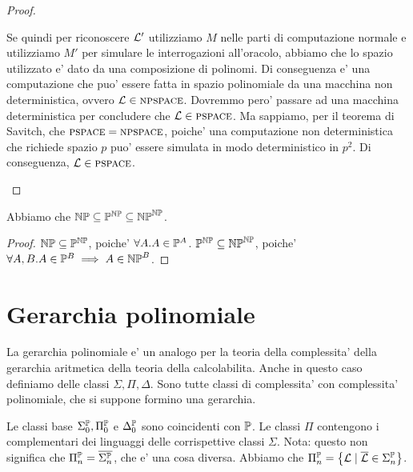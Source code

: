 \begin{proof}
\begin{enumerate}
                    Se quindi per riconoscere $\mathcal{L}'$ utilizziamo $M$ nelle parti di computazione
                    normale e utilizziamo $M'$ per simulare le interrogazioni all'oracolo, abbiamo
                    che lo spazio utilizzato e' dato da una composizione di polinomi. Di conseguenza
                    e' una computazione che puo' essere fatta in spazio polinomiale da una macchina
                    non deterministica, ovvero $\mathcal{L} \in \textsc{npspace}$. Dovremmo pero' passare ad una
                    macchina deterministica per concludere che $\mathcal{L} \in \textsc{pspace}$. Ma sappiamo, per
                    il teorema di Savitch, che $\textsc{pspace} = \textsc{npspace}$, poiche' una computazione non
                    deterministica che richiede spazio $p$ puo' essere simulata in modo
                    deterministico in $p^{2}$. Di conseguenza, $\mathcal{L} \in \textsc{pspace}$.
        \end{enumerate}
\end{proof}

\begin{thm}\label{thm:oracles1}
    Abbiamo che $\mathbb{NP} \subseteq \mathbb{P}^{\mathbb{NP}} \subseteq \mathbb{NP}^{\mathbb{NP}}$.
\end{thm}
\begin{proof}
    $\mathbb{NP} \subseteq \mathbb{P}^{\mathbb{NP}}$, poiche' $\forall A. A \in \mathbb{P}^{A}$.
    $\mathbb{P}^{\mathbb{NP}} \subseteq \mathbb{NP}^{\mathbb{NP}}$, poiche' $\forall A,B. A \in \mathbb{P}^{B}
    \implies A \in \mathbb{NP}^{B}$.
\end{proof}


\section{Gerarchia polinomiale}

La gerarchia polinomiale e' un analogo per la teoria della complessita' della gerarchia aritmetica
della teoria della calcolabilita. Anche in questo caso definiamo delle classi $\Sigma,\Pi,\Delta$.
Sono tutte classi di complessita' con complessita' polinomiale, che si suppone formino una
gerarchia.

Le classi base $\Sigma^{\mathbb{P}}_{0},\Pi^{\mathbb{P}}_{0}$ e $\Delta^{\mathbb{P}}_{0}$ sono coincidenti
con $\mathbb{P}$. Le classi $\Pi$ contengono i complementari dei linguaggi delle corrispettive classi
$\Sigma$. Nota: questo non significa che $\Pi_{n}^{\mathbb{P}} = \overline{\Sigma_{n}^{\mathbb{P}}}$, che e'
una cosa diversa.  Abbiamo che $\Pi_{n}^{\mathbb{P}} = \left\{ \mathcal{L} \mid \overline{\mathcal{L}} \in
\Sigma_{n}^{\mathbb{P}}\right\}$.

